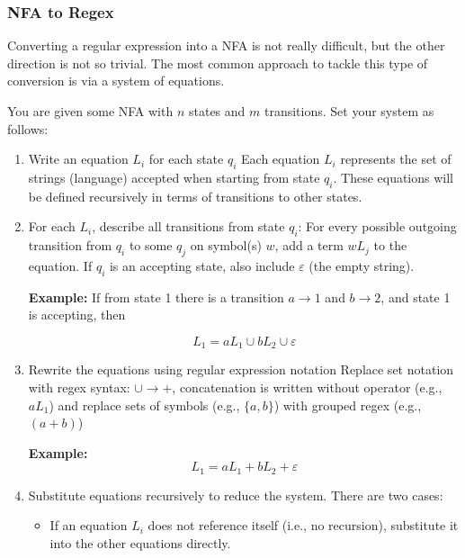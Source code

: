 \subsubsection{NFA to Regex}

Converting a regular expression into a NFA is not really difficult, but the other direction is not 
so trivial. The most common approach to tackle this type of conversion is via a system of equations.

You are given some NFA with \(n\) states and \(m\) transitions. Set your system as follows:

\begin{enumerate}

    \item Write an equation \(L_i\) for each state \(q_i\) 
    Each equation \(L_i\) represents the set of strings (language) accepted when starting from state 
    \(q_i\). These equations will be defined recursively in terms of transitions to other states.

    \item For each \(L_i\), describe all transitions from state \(q_i\):  
    For every possible outgoing transition from \(q_i\) to some \(q_j\) on symbol(s) \(w\), add a term 
    \(w L_j\) to the equation. If \(q_i\) is an accepting state, also include \(\varepsilon\) (the empty 
    string).

    \textbf{Example:} If from state 1 there is a transition \(a \to 1\) and \(b \to 2\), and state 1 is 
    accepting, then  
    
    \[
        L_1 = a L_1 \cup b L_2 \cup \varepsilon
    \]

    \item Rewrite the equations using regular expression notation  
    Replace set notation with regex syntax: \(\cup \to +\),  concatenation is written without operator 
    (e.g., \(a L_1\)) and replace sets of symbols (e.g., \(\{a, b\}\)) with grouped regex (e.g., \((a + b)\))

    \textbf{Example:}  
    \[
        L_1 = a L_1 + b L_2 + \varepsilon
    \]

    \item Substitute equations recursively to reduce the system. There are two cases:  
    
    \begin{itemize}
        
        \item If an equation \(L_i\) does not reference itself (i.e., no recursion), substitute 
        it into the other equations directly.
        

\end{itemize}
\end{enumerate}
